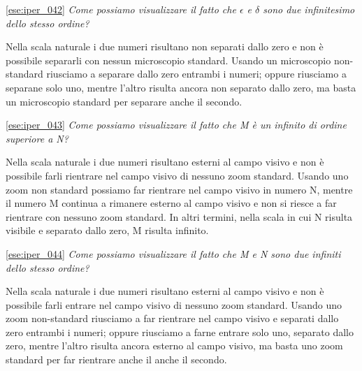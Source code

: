 \ref{ese:iper_042} 
\emph{Come possiamo visualizzare il fatto che \(\epsilon\) e \(\delta\) sono 
due infinitesimo dello stesso ordine?}

Nella scala naturale i due numeri risultano non separati dallo zero e non è 
possibile separarli con nessun microscopio standard. Usando un microscopio 
non-standard riusciamo a separare dallo zero entrambi i numeri; oppure 
riusciamo a separane solo uno, mentre l'altro risulta ancora non separato dallo 
zero, ma basta un microscopio standard per separare anche il secondo.

\ref{ese:iper_043} 
\emph{Come possiamo visualizzare il fatto che M è un infinito di ordine 
superiore a N?}

Nella scala naturale i due numeri risultano esterni al campo visivo e non è 
possibile farli rientrare nel campo visivo di nessuno zoom standard. Usando uno 
zoom non standard possiamo far rientrare nel campo visivo in numero N, mentre 
il numero M continua a rimanere esterno al campo visivo e non si riesce a far 
rientrare con nessuno zoom standard. In altri termini, nella scala in cui N 
risulta visibile e separato dallo zero, M risulta infinito.

\ref{ese:iper_044} 
\emph{Come possiamo visualizzare il fatto che M e N sono due infiniti dello 
stesso ordine?}

Nella scala naturale i due numeri risultano esterni al campo visivo e non è 
possibile farli entrare nel campo visivo di nessuno zoom standard. Usando uno 
zoom non-standard riusciamo a far rientrare nel campo visivo e separati dallo 
zero entrambi i numeri; oppure riusciamo a farne entrare solo uno, separato 
dallo zero, mentre l'altro risulta ancora esterno al campo visivo, ma basta uno 
zoom standard per far rientrare anche il anche il secondo.

\subsubsection*{}

